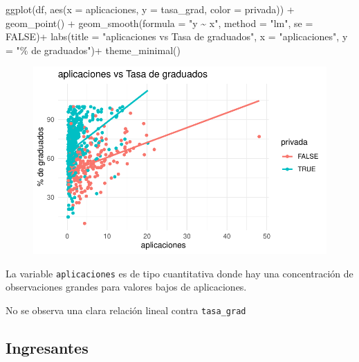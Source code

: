 \documentclass[
  letterpaper,
  DIV=11,
  numbers=noendperiod]{scrartcl}
\newenvironment{Shaded}{\begin{snugshade}}{\end{snugshade}}
\newcommand{\AttributeTok}[1]{\textcolor[rgb]{0.40,0.45,0.13}{#1}}
\newcommand{\ConstantTok}[1]{\textcolor[rgb]{0.56,0.35,0.01}{#1}}
\newcommand{\FunctionTok}[1]{\textcolor[rgb]{0.28,0.35,0.67}{#1}}
\newcommand{\NormalTok}[1]{\textcolor[rgb]{0.00,0.23,0.31}{#1}}
\newcommand{\SpecialCharTok}[1]{\textcolor[rgb]{0.37,0.37,0.37}{#1}}
\newcommand{\StringTok}[1]{\textcolor[rgb]{0.13,0.47,0.30}{#1}}
\begin{document}
\begin{Shaded}
\begin{Highlighting}[]
\FunctionTok{ggplot}\NormalTok{(df, }\FunctionTok{aes}\NormalTok{(}\AttributeTok{x =}\NormalTok{ aplicaciones, }\AttributeTok{y =}\NormalTok{ tasa\_grad, }\AttributeTok{color =}\NormalTok{ privada)) }\SpecialCharTok{+}
  \FunctionTok{geom\_point}\NormalTok{() }\SpecialCharTok{+} 
  \FunctionTok{geom\_smooth}\NormalTok{(}\AttributeTok{formula =} \StringTok{"y \textasciitilde{} x"}\NormalTok{, }\AttributeTok{method =} \StringTok{"lm"}\NormalTok{, }\AttributeTok{se =} \ConstantTok{FALSE}\NormalTok{)}\SpecialCharTok{+}
  \FunctionTok{labs}\NormalTok{(}\AttributeTok{title =} \StringTok{"aplicaciones vs Tasa de graduados"}\NormalTok{,}
       \AttributeTok{x =} \StringTok{"aplicaciones"}\NormalTok{,}
       \AttributeTok{y =} \StringTok{"\% de graduados"}\NormalTok{)}\SpecialCharTok{+}
  \FunctionTok{theme\_minimal}\NormalTok{()}
\end{Highlighting}
\end{Shaded}

\begin{figure}[H]

{\centering \includegraphics{TP_final_files/figure-pdf/unnamed-chunk-10-1.pdf}

}

\end{figure}

La variable \texttt{aplicaciones} es de tipo cuantitativa donde hay una
concentración de observaciones grandes para valores bajos de
aplicaciones.

No se observa una clara relación lineal contra \texttt{tasa\_grad}

\hypertarget{ingresantes}{%
\subsection{Ingresantes}\label{ingresantes}}
\end{document}
